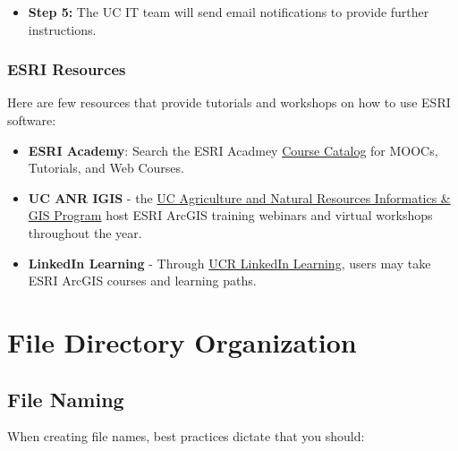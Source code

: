 \documentclass[
]{book}
\providecommand{\tightlist}{%
  \setlength{\itemsep}{0pt}\setlength{\parskip}{0pt}}
\begin{document}
\begin{itemize}
\tightlist
\item
  \textbf{Step 5:} The UC IT team will send email notifications to provide further instructions.
\end{itemize}

\hypertarget{esri-resources}{%
\subsection{ESRI Resources}\label{esri-resources}}

Here are few resources that provide tutorials and workshops on how to use ESRI software:

\begin{itemize}
\tightlist
\item
  \textbf{ESRI Academy}: Search the ESRI Acadmey \href{https://www.esri.com/training/}{Course Catalog} for MOOCs, Tutorials, and Web Courses.
\item
  \textbf{UC ANR IGIS} - the \href{https://igis.ucanr.edu/Training/}{UC Agriculture and Natural Resources Informatics \& GIS Program} host ESRI ArcGIS training webinars and virtual workshops throughout the year.
\item
  \textbf{LinkedIn Learning} - Through \href{https://www.linkedin.com/learning/topics/arcgis?u=26135898}{UCR LinkedIn Learning}, users may take ESRI ArcGIS courses and learning paths.
\end{itemize}

\hypertarget{organization}{%
\chapter{File Directory Organization}\label{organization}}

\hypertarget{file-naming}{%
\section{File Naming}\label{file-naming}}

When creating file names, best practices dictate that you should:
\end{document}
